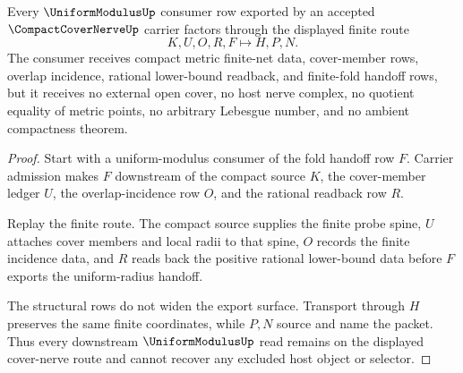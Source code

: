 \begin{theorem}
\label{thm:compact-cover-nerve-uniform-modulus-handoff}
Every $\UniformModulusUp$ consumer row exported by an accepted $\CompactCoverNerveUp$ carrier factors through the displayed finite route
$$
K,U,O,R,F \longmapsto H,P,N .
$$
The consumer receives compact metric finite-net data, cover-member rows, overlap incidence, rational lower-bound readback, and finite-fold handoff rows, but it receives no external open cover, no host nerve complex, no quotient equality of metric points, no arbitrary Lebesgue number, and no ambient compactness theorem.
\end{theorem}
\begin{proof}
Start with a uniform-modulus consumer of the fold handoff row $F$. Carrier admission makes $F$ downstream of the compact source $K$, the cover-member ledger $U$, the overlap-incidence row $O$, and the rational readback row $R$.

Replay the finite route. The compact source supplies the finite probe spine, $U$ attaches cover members and local radii to that spine, $O$ records the finite incidence data, and $R$ reads back the positive rational lower-bound data before $F$ exports the uniform-radius handoff.

The structural rows do not widen the export surface. Transport through $H$ preserves the same finite coordinates, while $P,N$ source and name the packet. Thus every downstream $\UniformModulusUp$ read remains on the displayed cover-nerve route and cannot recover any excluded host object or selector.
\end{proof}

\begin{closurestatus}{\CompactCoverNerveUp}
  \theoryclosure{\seedClosure}
  \formalstatus{\unformalizedV}
\end{closurestatus}
